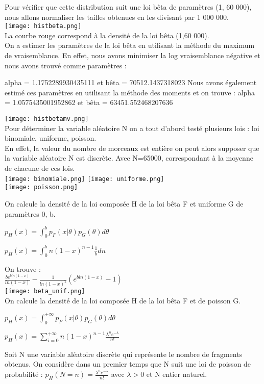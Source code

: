 \documentclass{book}
\begin{document}
Pour vérifier que cette distribution suit une loi bêta de paramètres (1, 60 000), nous allons normaliser les tailles obtenues en les divisant par 1 000 000.\\
\texttt{[image: histbeta.png]}\\
La courbe rouge correspond à la densité de la loi bêta (1,60 000).\\
On a estimer les paramètres de la loi bêta en utilisant la méthode du maximum de vraisemblance. En effet, nous avons minimiser la log vraisemblance négative et nous avons trouvé comme paramètres : 

alpha = 1.1752289930435111 et bêta = 70512.1437318023
Nous avons également estimé ces paramètres en utilisant la méthode des moments et on trouve : 
alpha = 1.0575435001952862 et bêta = 63451.552468207636

\texttt{[image: histbetamv.png]}\\
Pour déterminer la variable aléatoire N on a tout d'abord testé plusieurs lois : loi binomiale, uniforme, poisson. \\
En effet, la valeur du nombre de morceaux est entière on peut alors supposer que la variable aléatoire N est discrète.
Avec N=65000, correspondant à la moyenne de chacune de ces lois.
\\
\texttt{[image: binomiale.png]}
\texttt{[image: uniforme.png]}\\
\texttt{[image: poisson.png]}

On calcule la densité de la loi composée H de la loi bêta F et uniforme G de paramètres 0, b.

$p_{H}(x) = \int_{0}^{b} p_{F}(x|\theta) p_{G}(\theta)d\theta$

$p_{H}(x) = \int_{0}^{b}n(1-x)^{n-1}\frac{1}{b}dn$

On trouve : \\
$\frac{be^{bln(1-x)}}{ln(1-x)}-\frac{1}{ln(1-x)^2}(e^{bln(1-x)}-1)$\\
\texttt{[image: beta\_unif.png]}\\
On calcule la densité de la loi composée H de la loi bêta F et de poisson G.


$p_{H}(x) = \int_{0}^{+\infty} p_{F}(x|\theta) p_{G}(\theta)d\theta$

$p_{H}(x) = \sum_{i=0}^{+\infty}n(1-x)^{n-1}\frac{\lambda^{n}e^{-\lambda}}{n!}$

Soit N une variable aléatoire discrète qui représente le nombre de fragments obtenus.
On considère dans un premier temps que N suit une loi de poisson de probabilité : 
$p_{H}(N=n) =\frac{\lambda^{n}e^{-\lambda}}{n!}$
avec $\lambda >0 $ et N entier naturel.
\end{document}
